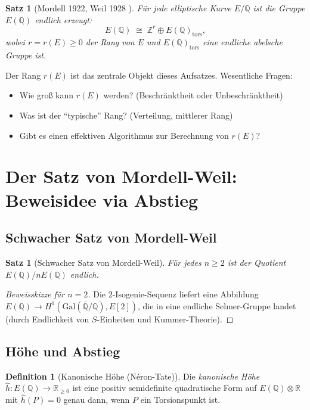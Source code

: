 \documentclass[12pt,a4paper]{amsart}
\newtheorem{satz}[theorem]{Satz}
\theoremstyle{definition}
\newtheorem{definition_de}[theorem]{Definition}
\theoremstyle{remark}
\newcommand{\Z}{\mathbb{Z}}
\newcommand{\Q}{\mathbb{Q}}
\newcommand{\R}{\mathbb{R}}
\newcommand{\Gal}{\mathrm{Gal}}
\begin{document}
\begin{satz}[Mordell 1922, Weil 1928 \cite{Mordell1922,Weil1928}]
  Für jede elliptische Kurve $E/\Q$ ist die Gruppe $E(\Q)$ endlich erzeugt:
  \[
    E(\Q) \;\cong\; \Z^r \oplus E(\Q)_{\mathrm{tors}},
  \]
  wobei $r = r(E) \geq 0$ der \emph{Rang} von $E$ und $E(\Q)_{\mathrm{tors}}$ eine
  endliche abelsche Gruppe ist.
\end{satz}

Der Rang $r(E)$ ist das zentrale Objekt dieses Aufsatzes. Wesentliche Fragen:
\begin{itemize}
  \item Wie groß kann $r(E)$ werden? (Beschränktheit oder Unbeschränktheit)
  \item Was ist der ``typische'' Rang? (Verteilung, mittlerer Rang)
  \item Gibt es einen effektiven Algorithmus zur Berechnung von $r(E)$?
\end{itemize}

\section{Der Satz von Mordell-Weil: Beweisidee via Abstieg}\label{sec:mordell_weil}

\subsection{Schwacher Satz von Mordell-Weil}

\begin{satz}[Schwacher Satz von Mordell-Weil]
  Für jedes $n \geq 2$ ist der Quotient $E(\Q)/nE(\Q)$ endlich.
\end{satz}

\begin{proof}[Beweisskizze f\"ur $n=2$]
  Die $2$-Isogenie-Sequenz liefert eine Abbildung
  $E(\Q) \to H^1(\Gal(\overline{\Q}/\Q), E[2])$,
  die in eine endliche Selmer-Gruppe landet (durch Endlichkeit von $S$-Einheiten und
  Kummer-Theorie).
\end{proof}

\subsection{Höhe und Abstieg}

\begin{definition_de}[Kanonische Höhe (Néron-Tate)]
  Die \emph{kanonische Höhe} $\hat{h}\colon E(\Q) \to \R_{\geq 0}$ ist eine positiv
  semidefinite quadratische Form auf $E(\Q) \otimes \R$ mit $\hat{h}(P) = 0$ genau dann,
  wenn $P$ ein Torsionspunkt ist.
\end{definition_de}
\end{document}
